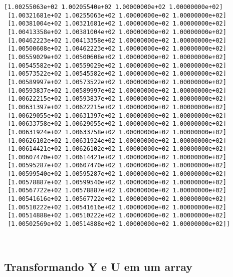 \documentclass[11pt]{article}
\begin{document}
\begin{Verbatim}[commandchars=\\\{\}]
 [1.00255063e+02 1.00205540e+02 1.00000000e+02 1.00000000e+02]
 [1.00321681e+02 1.00255063e+02 1.00000000e+02 1.00000000e+02]
 [1.00381004e+02 1.00321681e+02 1.00000000e+02 1.00000000e+02]
 [1.00413358e+02 1.00381004e+02 1.00000000e+02 1.00000000e+02]
 [1.00462223e+02 1.00413358e+02 1.00000000e+02 1.00000000e+02]
 [1.00500608e+02 1.00462223e+02 1.00000000e+02 1.00000000e+02]
 [1.00559029e+02 1.00500608e+02 1.00000000e+02 1.00000000e+02]
 [1.00545582e+02 1.00559029e+02 1.00000000e+02 1.00000000e+02]
 [1.00573522e+02 1.00545582e+02 1.00000000e+02 1.00000000e+02]
 [1.00589997e+02 1.00573522e+02 1.00000000e+02 1.00000000e+02]
 [1.00593837e+02 1.00589997e+02 1.00000000e+02 1.00000000e+02]
 [1.00622215e+02 1.00593837e+02 1.00000000e+02 1.00000000e+02]
 [1.00631397e+02 1.00622215e+02 1.00000000e+02 1.00000000e+02]
 [1.00629055e+02 1.00631397e+02 1.00000000e+02 1.00000000e+02]
 [1.00633758e+02 1.00629055e+02 1.00000000e+02 1.00000000e+02]
 [1.00631924e+02 1.00633758e+02 1.00000000e+02 1.00000000e+02]
 [1.00626102e+02 1.00631924e+02 1.00000000e+02 1.00000000e+02]
 [1.00614421e+02 1.00626102e+02 1.00000000e+02 1.00000000e+02]
 [1.00607470e+02 1.00614421e+02 1.00000000e+02 1.00000000e+02]
 [1.00595287e+02 1.00607470e+02 1.00000000e+02 1.00000000e+02]
 [1.00599540e+02 1.00595287e+02 1.00000000e+02 1.00000000e+02]
 [1.00578887e+02 1.00599540e+02 1.00000000e+02 1.00000000e+02]
 [1.00567722e+02 1.00578887e+02 1.00000000e+02 1.00000000e+02]
 [1.00541616e+02 1.00567722e+02 1.00000000e+02 1.00000000e+02]
 [1.00510222e+02 1.00541616e+02 1.00000000e+02 1.00000000e+02]
 [1.00514888e+02 1.00510222e+02 1.00000000e+02 1.00000000e+02]
 [1.00502569e+02 1.00514888e+02 1.00000000e+02 1.00000000e+02]]



    \end{Verbatim}

    \subsection{Transformando Y e U em um
array}\label{transformando-y-e-u-em-um-array}
\end{document}

